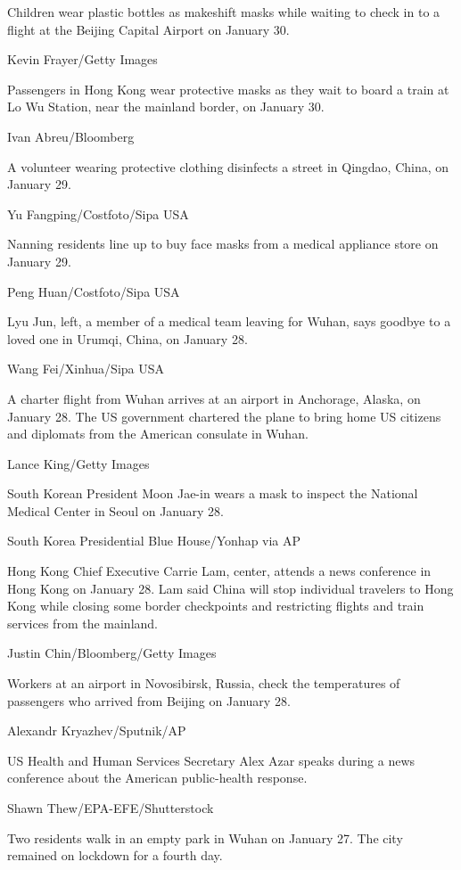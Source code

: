 Children wear plastic bottles as makeshift masks while waiting to check
in to a flight at the Beijing Capital Airport on January 30.

Kevin Frayer/Getty Images

Passengers in Hong Kong wear protective masks as they wait to board a
train at Lo Wu Station, near the mainland border, on January 30.

Ivan Abreu/Bloomberg

A volunteer wearing protective clothing disinfects a street in Qingdao,
China, on January 29.

Yu Fangping/Costfoto/Sipa USA

Nanning residents line up to buy face masks from a medical appliance
store on January 29.

Peng Huan/Costfoto/Sipa USA

Lyu Jun, left, a member of a medical team leaving for Wuhan, says
goodbye to a loved one in Urumqi, China, on January 28.

Wang Fei/Xinhua/Sipa USA

A charter flight from Wuhan arrives at an airport in Anchorage, Alaska,
on January 28. The US government chartered the plane to bring home US
citizens and diplomats from the American consulate in Wuhan.

Lance King/Getty Images

South Korean President Moon Jae-in wears a mask to inspect the National
Medical Center in Seoul on January 28.

South Korea Presidential Blue House/Yonhap via AP

Hong Kong Chief Executive Carrie Lam, center, attends a news conference
in Hong Kong on January 28. Lam said China will stop individual
travelers to Hong Kong while closing some border checkpoints and
restricting flights and train services from the mainland.

Justin Chin/Bloomberg/Getty Images

Workers at an airport in Novosibirsk, Russia, check the temperatures of
passengers who arrived from Beijing on January 28.

Alexandr Kryazhev/Sputnik/AP

US Health and Human Services Secretary Alex Azar speaks during a news
conference about the American public-health response.

Shawn Thew/EPA-EFE/Shutterstock

Two residents walk in an empty park in Wuhan on January 27. The city
remained on lockdown for a fourth day.

